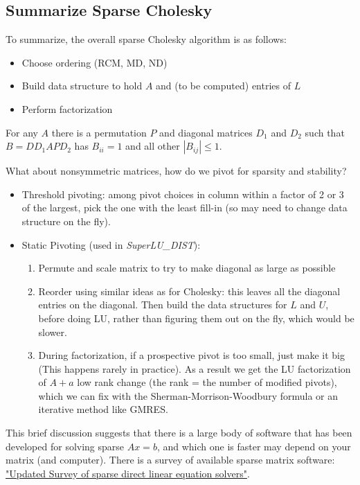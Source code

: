 \documentclass[11pt]{article}
\numberwithin{equation}{section}
\begin{document}
\subsection{Summarize Sparse Cholesky}
To summarize, the overall sparse Cholesky algorithm is as follows:\begin{itemize}
    \item Choose ordering (RCM, MD, ND)
    \item Build data structure to hold $A$ and (to be computed) entries of $L$
    \item Perform factorization
\end{itemize}

\begin{theorem}
    For any $A$ there is a permutation $P$ and diagonal matrices $D_1$ and $D_2$ such that $B = DD_1 A P D_2$ has $B_{ii} = 1$ and all other $|B_{ij}| \leq 1$.
\end{theorem}

What about nonsymmetric matrices, how do we pivot for sparsity and stability?\begin{itemize}
    \item Threshold pivoting: among pivot choices in column within a factor of 2 or 3 of the largest, pick the one with the least fill-in 
    (so may need to change data structure on the fly).
    \item Static Pivoting (used in \textit{SuperLU\_DIST}): 
    \begin{enumerate}
        \item Permute and scale matrix to try to make diagonal as large as possible
        \item Reorder using similar ideas as for Cholesky: this leaves all the diagonal entries on the diagonal. Then build the data structures for $L$ and $U$, 
        before doing LU, rather than figuring them out on the fly, which would be slower.
        \item During factorization, if a prospective pivot is too small, just make it big (This happens rarely in practice). 
        As a result we get the LU factorization of $A + a$ low rank change (the rank = the number of modified pivots), which we can fix with the Sherman-Morrison-Woodbury formula or an iterative method like GMRES.
    \end{enumerate}
\end{itemize}

This brief discussion suggests that there is a large body of software that has been developed for solving sparse $Ax=b$, 
and which one is faster may depend on your matrix (and computer). There is a survey of available sparse matrix software:
\href{http://crd.lbl.gov/~xiaoye/SuperLU/SparseDirectSurvey.pdf}{"Updated Survey of sparse direct linear equation solvers"}.
\end{document}
